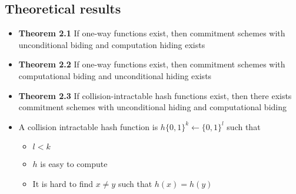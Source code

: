 \subsection{Theoretical results}
\begin{itemize}
  \item \textbf{Theorem 2.1} If one-way functions exist, then commitment schemes with unconditional biding and computation hiding exists
  \item \textbf{Theorem 2.2} If one-way functions exist, then commitment schemes with computational biding and unconditional hiding exists
  \item \textbf{Theorem 2.3} If collision-intractable hash functions exist, then there exists commitment schemes with unconditional hiding and computational biding
  \item A collision intractable hash function is $h \{0,1\}^k \leftarrow \{0,1\}^l$ such that
  \begin{itemize}
  	\item $l< k$
  	\item $h$ is easy to compute
  	\item It is hard to find $x \ne y$ such that $h(x) = h(y)$
  \end{itemize}
\end{itemize}

